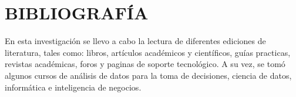 \documentclass[11pt,titlepage]{report}
\begin{document}
 








\chapter{BIBLIOGRAFÍA}
En esta investigación se llevo a cabo la lectura de diferentes ediciones de literatura, tales como: libros, artículos académicos y científicos, guías practicas, revistas académicas, foros y paginas de soporte tecnológico. A su vez, se tomó algunos cursos de análisis de datos para la toma de decisiones, ciencia de datos, informática e inteligencia de negocios.



\end{document}
